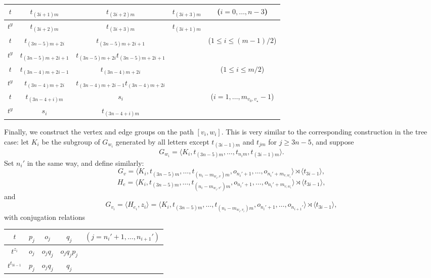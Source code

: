 \documentclass[12pt,leqno]{amsart}
\newcommand{\2}{L^2_{\rm per}(0, T)}
\numberwithin{equation}{section}
\numberwithin{figure}{section}
\begin{document}
\begin{center}
    \begin{tabular}{c||c|c|cc}
        $t$ & $t_{(3i+1)m}$ & $t_{(3i+2)m}$ & $t_{(3i+3)m}$ & ($i=0,\dots,n-3$) \\
        \hline
        $t^y$ & $t_{(3i+2)m}$ & $t_{(3i+3)m}$ & $t_{(3i+1)m}$ \\
        \hline
        $t$ & $t_{(3n-5)m+2i}$ & $t_{(3n-5)m+2i+1}$ & & ($1\leq i\leq (m-1)/2$) \\
        \hline
        $t^y$ & $t_{(3n-5)m+2i+1}$ & $t_{(3n-5)m+2i}t_{(3n-5)m+2i+1}$ \\
        \hline
        $t$ & $t_{(3n-4)m+2i-1}$ & $t_{(3n-4)m+2i}$ & & ($1\leq i\leq m/2$) \\
        \hline
        $t^y$ & $t_{(3n-4)m+2i}$ & $t_{(3n-4)m+2i-1}t_{(3n-4)m+2i}$ \\
        \hline
        $t$ & $t_{(3n-4+i)m}$ & $s_i$ & & ($i=1,\dots, m_{v_0,v_\star}-1$) \\
        \hline
        $t^y$ & $s_i$ & $t_{(3n-4+i)m}$
        \end{tabular}
\end{center}
Finally, we construct the vertex and edge groups on the path $[v_i,w_i]$. This is very similar to the corresponding construction in the tree case: let $K_i$ be the subgroup of $G_{w_i}$ generated by all letters except $t_{(3i-1)m}$ and $t_{jm}$ for $j\geq 3n-5$, and suppose
\[
G_{w_i} = \langle K_i, t_{(3n-5)m},\dots, t_{n_im},t_{(3i-1)m}\rangle.
\]
Set $n_i'$ in the same way, and define similarly:
\[
G_v = \langle K_i, t_{(3n-5)m},\dots, t_{(n_i-m_{w_i,v})m},o_{n_i'+1},\dots, o_{n_i'+m_{v,w_i}}\rangle\rtimes \langle t_{3i-1}\rangle,
\]
\[
H_e = \langle K_i, t_{(3n-5)m},\dots, t_{(n_i-m_{w_i,v'})m},o_{n_i'+1},\dots, o_{n_i'+m_{v,w_i}}\rangle\rtimes \langle t_{3i-1}\rangle,
\]
and
\[
G_{v_i} = \langle H_{e_i},z_i\rangle = \langle K_i, t_{(3n-5)m},\dots, t_{(n_i-m_{w_i,v_i})m},o_{n_i'+1},\dots, o_{n_{i+1}'}\rangle\rtimes \langle t_{3i-1}\rangle,
\]
with conjugation relations
\begin{center}
    \begin{tabular}{c||c|c|cc}
        $t$ & $p_j$ & $o_j$ & $q_j$ & $(j=n_i'+1,\dots,n_{i+1}')$ \\
        \hline
        $t^{z_i}$ & $o_j$ & $o_jq_j$ & $o_jq_jp_j$ \\
        \hline
        $t^{t_{3i-1}}$ & $p_j$ & $o_jq_j$ & $q_j$
    \end{tabular}
\end{center}
\end{document}
